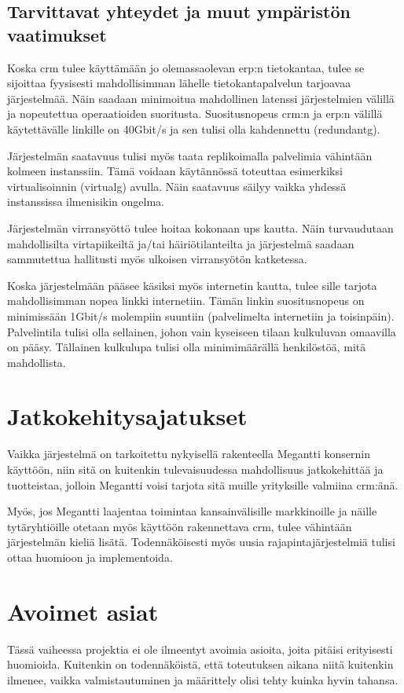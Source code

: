     \subsection{Tarvittavat yhteydet ja muut ympäristön vaatimukset}  %
        Koska \gls{crm} tulee käyttämään jo olemassaolevan \gls{erp}:n tietokantaa, tulee se sijoittaa fyysisesti mahdollisimman lähelle tietokantapalvelun
        tarjoavaa järjestelmää. Näin saadaan minimoitua mahdollinen latenssi järjestelmien välillä ja nopeutettua operaatioiden suoritusta. Suositusnopeus 
        \gls{crm}:n ja \gls{erp}:n välillä käytettävälle linkille on 40Gbit/s ja sen tulisi olla kahdennettu (\gls{redundantg}). \cite{crm}

        Järjestelmän saatavuus tulisi myös taata replikoimalla palvelimia vähintään kolmeen instanssiin. Tämä voidaan käytännössä toteuttaa esimerkiksi virtualisoinnin 
        (\gls{virtualg}) avulla. Näin saatavuus säilyy vaikka yhdessä instanssissa ilmenisikin ongelma. 
        
        Järjestelmän virransyöttö tulee hoitaa kokonaan \gls{ups} kautta. Näin turvaudutaan mahdollisilta virtapiikeiltä ja/tai häiriötilanteilta ja järjestelmä saadaan
        sammutettua hallitusti myös ulkoisen virransyötön katketessa. 
        
        Koska järjestelmään pääsee käsiksi myös internetin kautta, tulee sille tarjota mahdollisimman nopea linkki internetiin. Tämän linkin suositusnopeus on minimissään 
        1Gbit/s molempiin suuntiin (palvelimelta internetiin ja toisinpäin). 
        Palvelintila tulisi olla sellainen, johon vain kyseiseen tilaan kulkuluvan omaavilla on pääsy. Tällainen kulkulupa tulisi olla minimimäärällä henkilöstöä, mitä mahdollista. 

\section{Jatkokehitysajatukset}     %

    Vaikka järjestelmä on tarkoitettu nykyisellä rakenteella Megantti konser\-nin käyt\-töön, niin sitä on kuitenkin tulevai\-suudes\-sa
    mahdollisuus jatkokehittää ja tuotteistaa, jolloin Megantti voisi tarjota sitä muille yrityksille valmiina \gls{crm}:änä.

    Myös, jos Megantti laajentaa toimintaa kansainvälisille markkinoille ja näille tytär\-yhtiöil\-le otetaan myös käyttöön raken\-net\-tava
    \gls{crm}, tulee vähintään järjestelmän kieliä lisätä. Todennäköisesti myös uusia rajapintajärjestelmiä tulisi ottaa huomioon ja implementoida.

\section{Avoimet asiat}     %

    Tässä vaiheessa projektia ei ole ilmeentyt avoimia asioita, joita pitäisi erityisesti huomioida. Kuitenkin on todennäköistä, että toteutuksen aikana niitä kuitenkin
    ilmenee, vaikka valmistautuminen ja määrittely olisi tehty kuinka hyvin tahansa.




   
